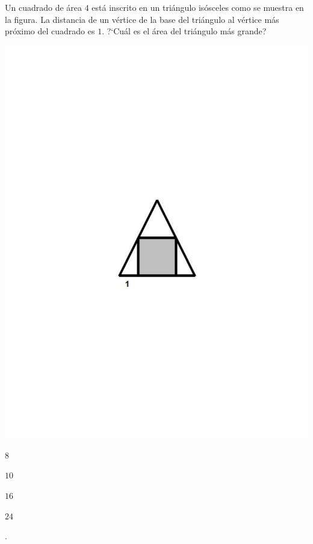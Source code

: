 \begin{Solucion}
  
\end{Solucion}

\begin{Problema}{6}
  Un cuadrado de \'area $4$ est\'a inscrito en un tri\'angulo
  is\'osceles como se muestra en la figura. La distancia de un
  v\'ertice de la base del tri\'angulo al v\'ertice m\'as pr\'oximo
  del cuadrado es $1$. ?`Cu\'al es el \'area del tri\'angulo m\'as
  grande?

  \begin{center}
    \includegraphics[scale=0.5,viewport=203 299 409 493]{triangulo_con_cuadrado.pdf}
  \end{center}

  \begin{inparaenum}
  \item $8$ \esp
  \item $10$ \esp
  \item $16$ \esp
  \item $24$ \esp
  \item \nota.
  \end{inparaenum}
\end{Problema}

